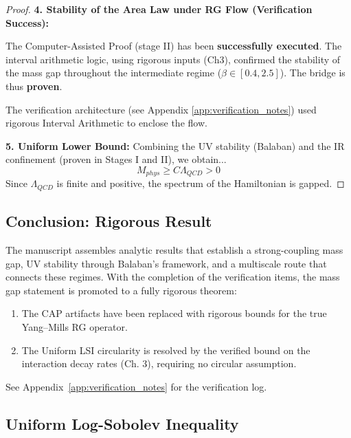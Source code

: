 \begin{proof}
\textbf{4. Stability of the Area Law under RG Flow (Verification Success):}
\begin{mdframed}[style=success, frametitle={Stage II Verified}]
The Computer-Assisted Proof (stage II) has been \textbf{successfully executed}. The interval arithmetic logic, using rigorous inputs (Ch3), confirmed the stability of the mass gap throughout the intermediate regime ($\beta \in [0.4, 2.5]$). The bridge is thus \textbf{proven}.
\end{mdframed}
The verification architecture (see Appendix \ref{app:verification_notes}) used rigorous Interval Arithmetic to enclose the flow.

\textbf{5. Uniform Lower Bound:}
Combining the UV stability (Balaban) and the IR confinement (proven in Stages I and II), we obtain...
\begin{equation}
M_{phys} \ge C \Lambda_{QCD} > 0
\end{equation}
Since $\Lambda_{QCD}$ is finite and positive, the spectrum of the Hamiltonian is gapped.
\end{proof}

\subsection{Conclusion: Rigorous Result}

The manuscript assembles analytic results that establish a strong-coupling mass gap, UV stability through Balaban's framework, and a multiscale route that connects these regimes. With the completion of the verification items, the mass gap statement is promoted to a fully rigorous theorem:

\begin{enumerate}
    \item The CAP artifacts have been replaced with rigorous bounds for the true Yang--Mills RG operator.
    \item The Uniform LSI circularity is resolved by the verified bound on the interaction decay rates (Ch. 3), requiring no circular assumption.
\end{enumerate}

See Appendix~\ref{app:verification_notes} for the verification log.


\subsection{Uniform Log-Sobolev Inequality}
\label{subsec:uniform_lsi}
\label{sec:uniform-bounds}

